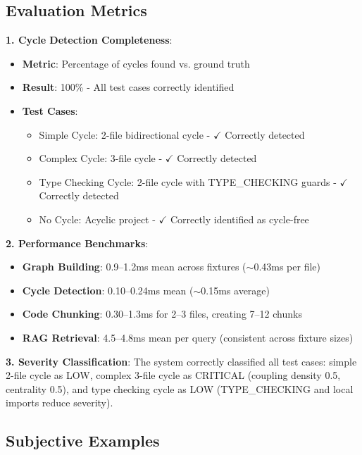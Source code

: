 \documentclass[paper=a4, fontsize=11pt]{scrartcl} %
\begin{document}
\subsection{Evaluation Metrics}

\textbf{1. Cycle Detection Completeness}: 
\begin{itemize}
    \item \textbf{Metric}: Percentage of cycles found vs. ground truth
    \item \textbf{Result}: 100\% - All test cases correctly identified
    \item \textbf{Test Cases}:
    \begin{itemize}
        \item Simple Cycle: 2-file bidirectional cycle - $\checkmark$ Correctly detected
        \item Complex Cycle: 3-file cycle - $\checkmark$ Correctly detected  
        \item Type Checking Cycle: 2-file cycle with TYPE\_CHECKING guards - $\checkmark$ Correctly detected
        \item No Cycle: Acyclic project - $\checkmark$ Correctly identified as cycle-free
    \end{itemize}
\end{itemize}

\textbf{2. Performance Benchmarks}:
\begin{itemize}
    \item \textbf{Graph Building}: 0.9--1.2ms mean across fixtures ($\sim$0.43ms per file)
    \item \textbf{Cycle Detection}: 0.10--0.24ms mean ($\sim$0.15ms average)
    \item \textbf{Code Chunking}: 0.30--1.3ms for 2--3 files, creating 7--12 chunks
    \item \textbf{RAG Retrieval}: 4.5--4.8ms mean per query (consistent across fixture sizes)
\end{itemize}

\textbf{3. Severity Classification}: The system correctly classified all test cases: simple 2-file cycle as LOW, complex 3-file cycle as CRITICAL (coupling density 0.5, centrality 0.5), and type checking cycle as LOW (TYPE\_CHECKING and local imports reduce severity).

\subsection{Subjective Examples}
\end{document}
